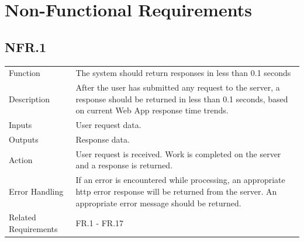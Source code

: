 \documentclass[12pt]{article}
\begin{document}

\section{Non-Functional Requirements}
    \subsection*{NFR.1}
    \begin{center}
        \begin{tabular}{| p{10em} p{26em} |}
        \hline
         Function & The system should return responses in less than 0.1 seconds\\
         Description & After the user has submitted any request to the server, a response should be returned in less than 0.1 seconds, based on current Web App response time trends.\\
         Inputs & User request data.\\
         Outputs & Response data.\\
         Action & User request is received. Work is completed on the server and a response is returned.\\
         Error Handling & If an error is encountered while processing, an appropriate http error response will be returned from the server. An appropriate error message should be returned.\\
         Related Requirements & FR.1 - FR.17\\
         \hline
        \end{tabular}
    \end{center}
\end{document}
